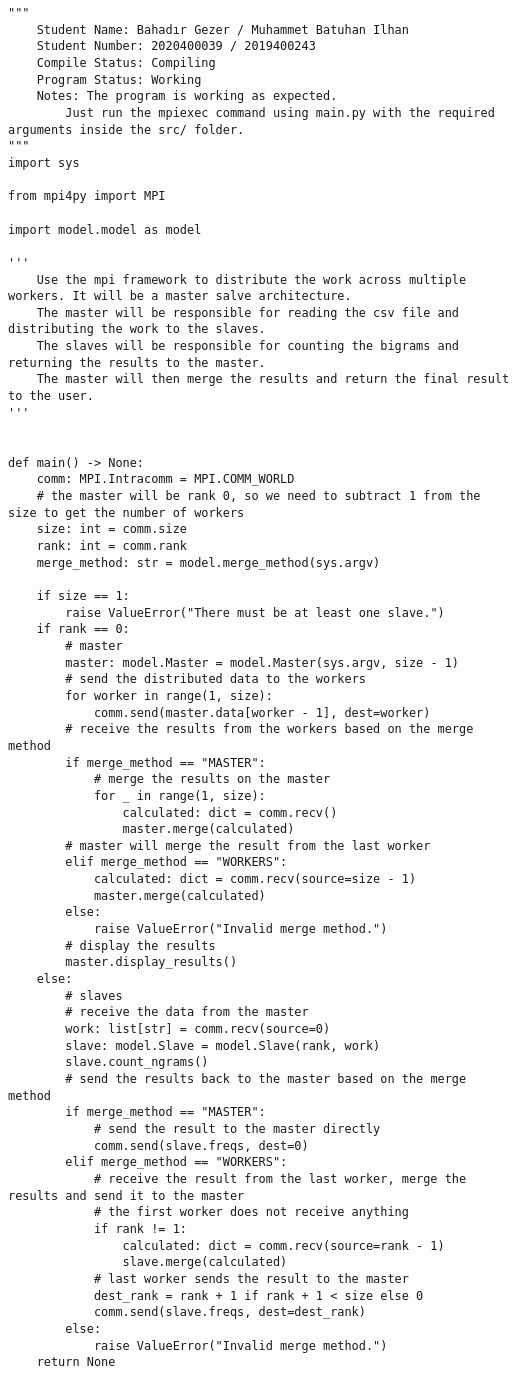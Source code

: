 \documentclass[12pt, A4, titlepage]{article}
\begin{document}
\begin{verbatim}
"""
    Student Name: Bahadır Gezer / Muhammet Batuhan Ilhan
    Student Number: 2020400039 / 2019400243
    Compile Status: Compiling
    Program Status: Working
    Notes: The program is working as expected.
        Just run the mpiexec command using main.py with the required arguments inside the src/ folder.
"""
import sys

from mpi4py import MPI

import model.model as model

'''
    Use the mpi framework to distribute the work across multiple workers. It will be a master salve architecture.
    The master will be responsible for reading the csv file and distributing the work to the slaves. 
    The slaves will be responsible for counting the bigrams and returning the results to the master.
    The master will then merge the results and return the final result to the user.
'''


def main() -> None:
    comm: MPI.Intracomm = MPI.COMM_WORLD
    # the master will be rank 0, so we need to subtract 1 from the size to get the number of workers
    size: int = comm.size
    rank: int = comm.rank
    merge_method: str = model.merge_method(sys.argv)

    if size == 1:
        raise ValueError("There must be at least one slave.")
    if rank == 0:
        # master
        master: model.Master = model.Master(sys.argv, size - 1)
        # send the distributed data to the workers
        for worker in range(1, size):
            comm.send(master.data[worker - 1], dest=worker)
        # receive the results from the workers based on the merge method
        if merge_method == "MASTER":
            # merge the results on the master
            for _ in range(1, size):
                calculated: dict = comm.recv()
                master.merge(calculated)
        # master will merge the result from the last worker
        elif merge_method == "WORKERS":
            calculated: dict = comm.recv(source=size - 1)
            master.merge(calculated)
        else:
            raise ValueError("Invalid merge method.")
        # display the results
        master.display_results()
    else:
        # slaves
        # receive the data from the master
        work: list[str] = comm.recv(source=0)
        slave: model.Slave = model.Slave(rank, work)
        slave.count_ngrams()
        # send the results back to the master based on the merge method
        if merge_method == "MASTER":
            # send the result to the master directly
            comm.send(slave.freqs, dest=0)
        elif merge_method == "WORKERS":
            # receive the result from the last worker, merge the results and send it to the master
            # the first worker does not receive anything
            if rank != 1:
                calculated: dict = comm.recv(source=rank - 1)
                slave.merge(calculated)
            # last worker sends the result to the master
            dest_rank = rank + 1 if rank + 1 < size else 0
            comm.send(slave.freqs, dest=dest_rank)
        else:
            raise ValueError("Invalid merge method.")
    return None



\end{verbatim}
\end{document}
